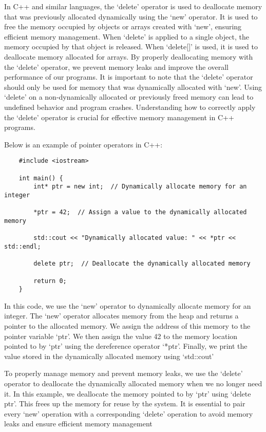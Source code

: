 In C++ and similar languages, the `delete' operator is used to deallocate memory that was previously allocated dynamically using the `new' operator. It is used to free the memory occupied by objects or arrays created with `new', ensuring 
efficient memory management. When `delete' is applied to a single object, the memory occupied by that object is released. When `delete[]' is used, it is used to deallocate memory allocated for arrays. By properly deallocating memory with 
the `delete' operator, we prevent memory leaks and improve the overall performance of our programs. It is important to note that the `delete' operator should only be used for memory that was dynamically allocated with `new'. Using `delete' 
on a non-dynamically allocated or previously freed memory can lead to undefined behavior and program crashes. Understanding how to correctly apply the `delete' operator is crucial for effective memory management in C++ programs.

\begin{solution}
    Below is an example of pointer operators in C++:
    
    \horizontalline
    
    \begin{verbatim}   
    #include <iostream>
    
    int main() {
        int* ptr = new int;  // Dynamically allocate memory for an integer
    
        *ptr = 42;  // Assign a value to the dynamically allocated memory
    
        std::cout << "Dynamically allocated value: " << *ptr << std::endl;
    
        delete ptr;  // Deallocate the dynamically allocated memory
    
        return 0;
    }
        \end{verbatim}
    
    \horizontalline

    In this code, we use the `new' operator to dynamically allocate memory for an integer. The `new' operator allocates memory from the heap and returns a pointer to the allocated memory. We assign the address of this memory to the 
    pointer variable `ptr'. We then assign the value 42 to the memory location pointed to by `ptr' using the dereference operator `*ptr'. Finally, we print the value stored in the dynamically allocated memory using `std::cout'
    
    To properly manage memory and prevent memory leaks, we use the `delete' operator to deallocate the dynamically allocated memory when we no longer need it. In this example, we deallocate the memory pointed to by `ptr' using `delete ptr'. 
    This frees up the memory for reuse by the system. It is essential to pair every `new' operation with a corresponding `delete' operation to avoid memory leaks and ensure efficient memory management
\end{solution}

